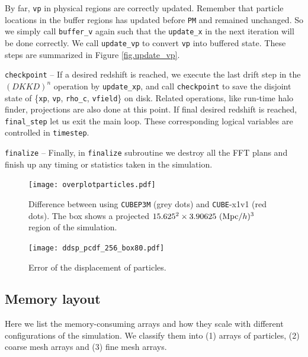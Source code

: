 \documentclass[10pt,twocolumn,preprint]{emulateapj}
\begin{document}
By far, {\tt vp} in physical regions are correctly updated. Remember that particle locations in the buffer regions has updated before {\tt PM} and remained unchanged. So we simply call {\tt buffer\_v} again such that the {\tt update\_x} in the next iteration will be done correctly. We call {\tt update\_vp} to convert {\tt vp} into buffered state. These steps are summarized in Figure \ref{fig.update_vp}.

{\tt checkpoint} -- 
If a desired redshift is reached, we execute the last drift step in the $(DKKD)^n$ operation by {\tt update\_xp}, and call {\tt checkpoint} to save the disjoint state of \{{\tt xp}, {\tt vp}, {\tt rho\_c}, {\tt vfield}\} on disk. Related operations, like run-time halo finder, projections are also done at this point. If final desired redshift is reached, {\tt final\_step} let us exit the main loop. These corresponding logical variables are controlled in {\tt timestep}.

{\tt finalize} --
Finally, in {\tt finalize} subroutine we destroy all the FFT plans and finish up any timing or statistics taken in the simulation.

\begin{figure}[t]
\centering
  \texttt{[image: overplotparticles.pdf]}
 \caption{Difference between using {\tt CUBEP3M} (grey dots) and {\tt CUBE}-x1v1 (red dots). The box shows a projected $15.625^2\times 3.90625\ ({\rm Mpc}/h)^3$ region of the simulation. }
\label{fig.particles}
\end{figure}

\begin{figure}[t]
\centering
  \texttt{[image: ddsp\_pcdf\_256\_box80.pdf]}
 \caption{Error of the displacement of particles.}
\label{fig.dsp}
\end{figure}


\subsection{Memory layout}\label{ss.memory}
Here we list the memory-consuming arrays and how they scale with different configurations of the simulation. We classify them into (1) arrays of particles, (2) coarse mesh arrays and (3) fine mesh arrays.
\end{document}
